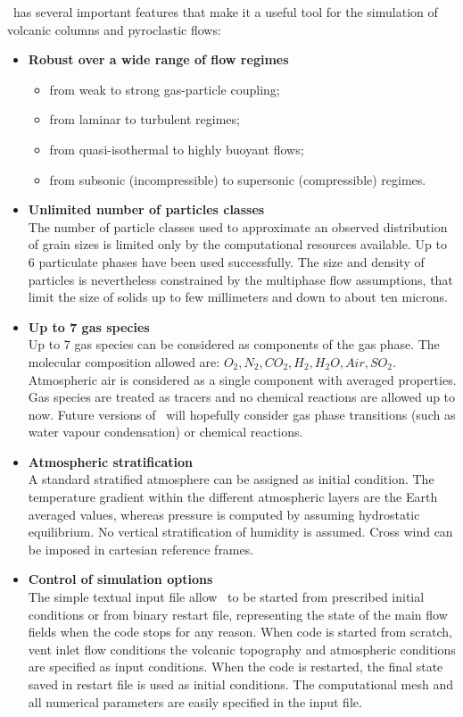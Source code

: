 \prettypar
\PDAC\ has several important features that make it a useful tool for the
simulation of volcanic columns and pyroclastic flows: 

\begin{itemize}

\item{\bf Robust over a wide range of flow regimes}
\begin{itemize}
\item from weak to strong gas-particle coupling;
\item from laminar to turbulent regimes;
\item from quasi-isothermal to highly buoyant flows;
\item from subsonic (incompressible) to supersonic (compressible) regimes.
\end{itemize}

\item{\bf Unlimited number of particles classes}\\
The number of particle classes used to approximate an observed distribution
of grain sizes is limited only by the computational resources available.
Up to 6 particulate phases have been used successfully. The size and density
of particles is nevertheless constrained by the multiphase flow assumptions,
that limit the size of solids up to few millimeters and down to about ten 
microns.

\item{\bf Up to 7 gas species}\\
Up to 7 gas species can be considered as components of the gas phase. The 
molecular composition allowed are: $O_2,N_2,CO_2,H_2,H_2O,Air,SO_2$.
Atmospheric air is considered as a single component with averaged properties.
Gas species are treated as tracers and no chemical reactions are allowed up to
now. Future versions of \PDAC\ will hopefully consider gas phase transitions
(such as water vapour condensation) or chemical reactions.

\item{\bf Atmospheric stratification}\\
A standard stratified atmosphere can be assigned as initial condition.
The temperature gradient within the different atmospheric layers are
the Earth averaged values, whereas pressure is computed by assuming hydrostatic
equilibrium. No vertical stratification of humidity is assumed. Cross wind
can be imposed in cartesian reference frames.

\item{\bf Control of simulation options}\\
The simple textual input file allow \PDAC\ to be started from prescribed
initial conditions or from binary restart file, representing the state
of the main flow fields when the code stops for any reason. When code
is started from scratch, vent inlet flow conditions the volcanic topography 
and atmospheric conditions are specified as input conditions. When the code
is restarted, the final state saved in restart file is used as initial 
conditions. The computational mesh and all numerical parameters are easily
specified in the input file.

\end{itemize}

